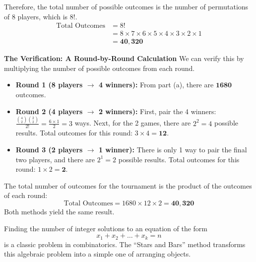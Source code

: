 \begin{solutionbox}
Therefore, the total number of possible outcomes is the number of permutations of 8 players, which is $8!$.
\begin{align*}
    \text{Total Outcomes} &= 8! \\
    &= 8 \times 7 \times 6 \times 5 \times 4 \times 3 \times 2 \times 1 \\
    &= \mathbf{40,320}
\end{align*}

\textbf{The Verification: A Round-by-Round Calculation}
We can verify this by multiplying the number of possible outcomes from each round.
\begin{itemize}
    \item \textbf{Round 1 (8 players $\to$ 4 winners):} From part (a), there are $\mathbf{1680}$ outcomes.
    
    \item \textbf{Round 2 (4 players $\to$ 2 winners):} 
    First, pair the 4 winners: $\frac{\binom{4}{2}\binom{2}{2}}{2!} = \frac{6 \times 1}{2} = 3$ ways.
    Next, for the 2 games, there are $2^2=4$ possible results.
    Total outcomes for this round: $3 \times 4 = \mathbf{12}$.
    
    \item \textbf{Round 3 (2 players $\to$ 1 winner):} 
    There is only 1 way to pair the final two players, and there are $2^1 = 2$ possible results.
    Total outcomes for this round: $1 \times 2 = \mathbf{2}$.
\end{itemize}
The total number of outcomes for the tournament is the product of the outcomes of each round:
\[
\text{Total Outcomes} = 1680 \times 12 \times 2 = \mathbf{40,320}
\]
Both methods yield the same result.
\end{solutionbox}

\begin{examplebox}
    Finding the number of integer solutions to an equation of the form
\[
x_1 + x_2 + \dots + x_k = n
\]
is a classic problem in combinatorics. The ``Stars and Bars'' method transforms this algebraic problem into a simple one of arranging objects.
\end{examplebox}

